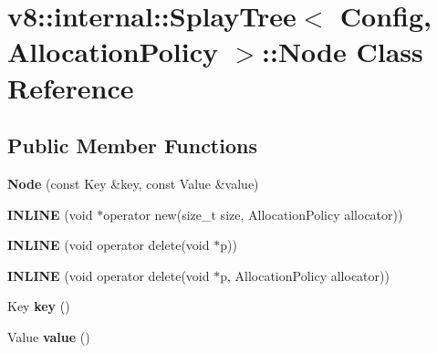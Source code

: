 \hypertarget{classv8_1_1internal_1_1_splay_tree_1_1_node}{}\section{v8\+:\+:internal\+:\+:Splay\+Tree$<$ Config, Allocation\+Policy $>$\+:\+:Node Class Reference}
\label{classv8_1_1internal_1_1_splay_tree_1_1_node}
\subsection*{Public Member Functions}
\begin{DoxyCompactItemize}
\item 
{\bfseries Node} (const Key \&key, const Value \&value)\hypertarget{classv8_1_1internal_1_1_splay_tree_1_1_node_afbf36c9ccaf941f68622801a7533d0d0}{}\label{classv8_1_1internal_1_1_splay_tree_1_1_node_afbf36c9ccaf941f68622801a7533d0d0}

\item 
{\bfseries I\+N\+L\+I\+NE} (void $\ast$operator new(size\+\_\+t size, Allocation\+Policy allocator))\hypertarget{classv8_1_1internal_1_1_splay_tree_1_1_node_a9bd54f48663614ee09849439846660b8}{}\label{classv8_1_1internal_1_1_splay_tree_1_1_node_a9bd54f48663614ee09849439846660b8}

\item 
{\bfseries I\+N\+L\+I\+NE} (void operator delete(void $\ast$p))\hypertarget{classv8_1_1internal_1_1_splay_tree_1_1_node_af779ae09bffd8be418ea99be2c38a2a5}{}\label{classv8_1_1internal_1_1_splay_tree_1_1_node_af779ae09bffd8be418ea99be2c38a2a5}

\item 
{\bfseries I\+N\+L\+I\+NE} (void operator delete(void $\ast$p, Allocation\+Policy allocator))\hypertarget{classv8_1_1internal_1_1_splay_tree_1_1_node_a24fc9f2bc36cc51ffb9ede55042c5624}{}\label{classv8_1_1internal_1_1_splay_tree_1_1_node_a24fc9f2bc36cc51ffb9ede55042c5624}

\item 
Key {\bfseries key} ()\hypertarget{classv8_1_1internal_1_1_splay_tree_1_1_node_a7ae7043f1ada5717bdfb33f2397ae750}{}\label{classv8_1_1internal_1_1_splay_tree_1_1_node_a7ae7043f1ada5717bdfb33f2397ae750}

\item 
Value {\bfseries value} ()\hypertarget{classv8_1_1internal_1_1_splay_tree_1_1_node_ad59061dcf7804af21eaf46c293ba6fe9}{}\label{classv8_1_1internal_1_1_splay_tree_1_1_node_ad59061dcf7804af21eaf46c293ba6fe9}


\end{DoxyCompactItemize}
